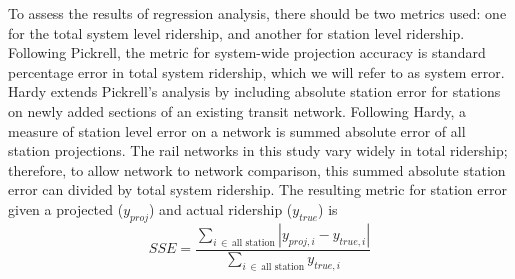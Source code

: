 \documentclass{article}
\begin{document}
To assess the results of regression analysis, there should be two metrics used: one for the total system level ridership, and another for station level ridership. Following Pickrell, the metric for system-wide projection accuracy is standard percentage error in total system ridership, which we will refer to as system error. Hardy \cite{Hardy2010} extends Pickrell's analysis by including absolute station error for stations on newly added sections of an existing transit network. Following Hardy, a measure of station level error on a network is summed absolute error of all station projections. The rail networks in this study vary widely in total ridership; therefore, to allow network to network comparison, this summed absolute station error can divided by total system ridership. The resulting metric for station error given a projected ($y_{proj}$) and actual ridership ($y_{true}$) is 
$$SSE = \dfrac{\sum\limits_{i\,\in\,\text{all station}}\left|y_{proj, i} - y_{true, i}\right|}{\sum\limits_{i\,\in\,\text{all station}} y_{true, i}}$$
\end{document}
